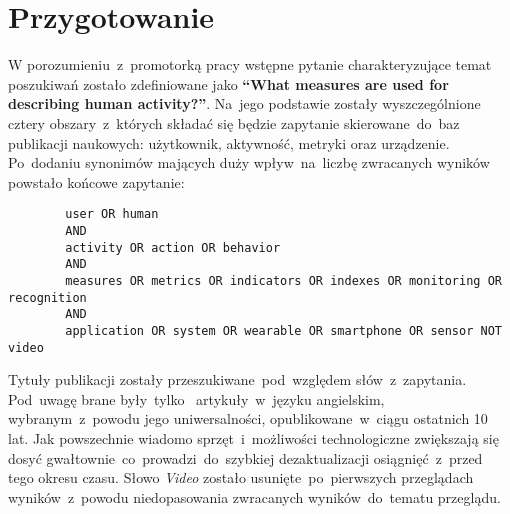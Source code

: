 \section{Przygotowanie}
W porozumieniu~z~promotorką pracy wstępne pytanie charakteryzujące temat poszukiwań zostało zdefiniowane jako \textbf{``What measures are used for describing human activity?''}. Na~jego podstawie zostały wyszczególnione cztery obszary~z~których składać się będzie zapytanie skierowane~do~baz publikacji naukowych: użytkownik, aktywność, metryki oraz urządzenie. Po~dodaniu synonimów mających duży wpływ~na~liczbę zwracanych wyników powstało końcowe zapytanie:

\bigskip
\begin{center}
	\begin{minipage}{0.9\linewidth}
		\begin{verbatim}
		user OR human
		AND
		activity OR action OR behavior
		AND
		measures OR metrics OR indicators OR indexes OR monitoring OR recognition
		AND
		application OR system OR wearable OR smartphone OR sensor NOT video
		\end{verbatim}
	\end{minipage}
\end{center}
\bigskip

Tytuły publikacji zostały przeszukiwane~pod~względem słów~z~zapytania. Pod~uwagę brane były~tylko~ artykuły~w~języku angielskim, wybranym~z~powodu jego uniwersalności, opublikowane~w~ciągu ostatnich 10 lat. Jak powszechnie wiadomo sprzęt~i~możliwości technologiczne zwiększają się dosyć gwałtownie~co~prowadzi~do~szybkiej dezaktualizacji osiągnięć~z~przed tego okresu czasu. Słowo \textit{Video} zostało usunięte~po~pierwszych przeglądach wyników~z~powodu niedopasowania zwracanych wyników~do~tematu przeglądu.
